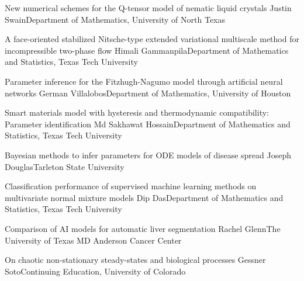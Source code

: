 \begin{postersPG}
\item\poster %
{New numerical schemes for the Q-tensor model of nematic liquid crystals}
{Justin Swain}{Department of Mathematics, University of North Texas}

\item\poster %
{A face-oriented stabilized Nitsche-type extended variational multiscale method for incompressible two-phase flow}
{Himali Gammanpila}{Department of Mathematics and Statistics, Texas Tech University}

\item\poster %
{Parameter inference for the Fitzhugh-Nagumo model through artificial neural networks}
{German Villalobos}{Department of Mathematics, University of Houston}

\item\poster %
{Smart materials model with hysteresis and thermodynamic compatibility: Parameter identification}
{Md Sakhawat Hossain}{Department of Mathematics and Statistics, Texas Tech University}


\item\poster %
{Bayesian methods to infer parameters for ODE models of disease spread}
{Joseph Douglas}{Tarleton State University}

\item\poster %
{Classification performance of supervised machine learning methods on multivariate normal mixture models}
{Dip Das}{Department of Mathematics and Statistics, Texas Tech University}


\item\poster %
{Comparison of AI models for automatic liver segmentation}
{Rachel Glenn}{The University of Texas MD Anderson Cancer Center }

\item\poster %
{On chaotic non-stationary steady-states and biological processes}
{Gessner Soto}{Continuing Education, University of Colorado}

\end{postersPG}

\room


